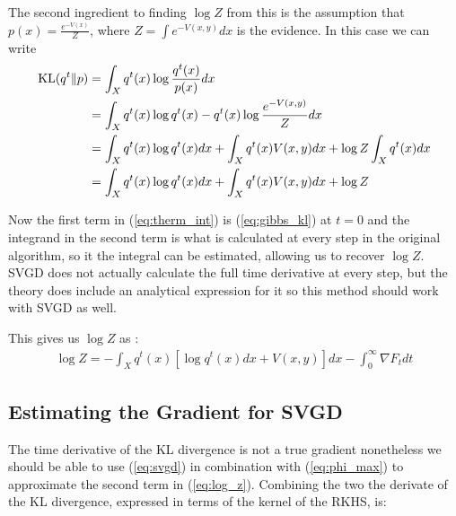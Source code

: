 \documentclass{article}
\begin{document}
The second ingredient to finding $\log Z$ from this is the assumption that $p(x) = \frac{ e^{-V(x)} }{ Z }$, 
where $Z = \int e^{-V(x, y)} dx$ is the evidence. In this case we can write
\begin{align}
\label{eq:gibbs_kl}
    \textrm{KL}( q^t \| p ) &= \int_X q^t(x) \log \frac{ q^t(x) }{ p(x) } dx \\
                    &= \int_X q^t(x) \log q^t(x) - q^t(x) \log \frac{ e^{-V(x, y)} }{ Z } dx \\
                    &= \int_X q^t(x) \log q^t(x) dx + \int_X q^t(x) V(x, y) dx + \log Z \int_X q^t(x) dx \\
                    &= \int_X q^t(x) \log q^t(x) dx + \int_X q^t(x) V(x, y) dx + \log Z
\end{align}

Now the first term in (\ref{eq:therm_int}) is (\ref{eq:gibbs_kl}) at $t=0$ and the integrand in the second term is
what is calculated at every step in the original algorithm, so it the integral can be estimated, allowing us to 
recover $\log Z$. SVGD does not actually calculate the full time derivative at every step, but the theory does 
include an analytical expression for it so this method should work with SVGD as well.

This gives us $\log Z$ as :
\begin{align}
\label{eq:log_z}
    \log Z = - \int_X q^t(x) [\log q^t(x) dx +  V(x, y)] dx 
        - \int_0^\infty \nabla F_t dt
\end{align}


\subsection{Estimating the Gradient for SVGD}
The time derivative of the KL divergence is not a true gradient nonetheless we should be able to use
(\ref{eq:svgd}) in combination with (\ref{eq:phi_max}) to approximate the second term in (\ref{eq:log_z}).
Combining the two the derivate of the KL divergence, expressed in terms of the kernel of the RKHS, is:
\end{document}

